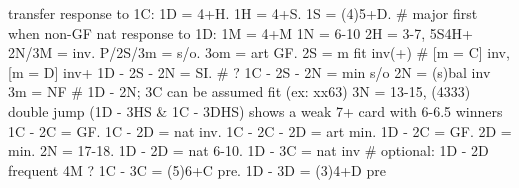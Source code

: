 transfer response to 1C: 1D = 4+H. 1H = 4+S. 1S = (4)5+D. 
    # major first when non-GF
nat response to 1D: 1M = 4+M
1N = 6-10
2H = 3-7, 5S4H+ 
    2N/3M = inv. P/2S/3m = s/o. 3om = art GF.
2S = m fit inv(+)  # [m = C] inv, [m = D] inv+
    1D - 2S - 2N = SI.  # ?
    1C - 2S - 2N = min s/o
2N = (s)bal inv
    3m = NF  # 1D - 2N; 3C can be assumed fit (ex: xx63)
3N = 13-15, (4333)
double jump (1D - 3HS & 1C - 3DHS) shows a weak 7+ card with 6-6.5 winners
1C - 2C = GF. 1C - 2D = nat inv.
    1C - 2C - 2D = art min.
1D - 2C = GF. 
    2D = min. 2N = 17-18.
1D - 2D = nat 6-10. 1D - 3C = nat inv
    # optional: 1D - 2D frequent 4M ?
1C - 3C = (5)6+C pre. 1D - 3D = (3)4+D pre